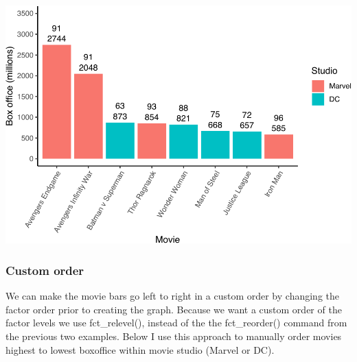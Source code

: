 \documentclass[
]{krantz}
\makeatletter
\newenvironment{Shaded}{\begin{snugshade}}{\end{snugshade}}
\newcommand{\DataTypeTok}[1]{\textcolor[rgb]{0.27,0.27,0.27}{#1}}
\newcommand{\KeywordTok}[1]{\textcolor[rgb]{0.27,0.27,0.27}{\textbf{#1}}}
\newcommand{\NormalTok}[1]{#1}
\newcommand{\OperatorTok}[1]{\textcolor[rgb]{0.43,0.43,0.43}{\textbf{#1}}}
\newcommand{\StringTok}[1]{\textcolor[rgb]{0.5,0.5,0.5}{#1}}
\newenvironment{kframe}{%
\medskip{}
\setlength{\fboxsep}{.8em}
 \def\at@end@of@kframe{}%
 \ifinner\ifhmode%
  \def\at@end@of@kframe{\end{minipage}}%
  \begin{minipage}{\columnwidth}%
 \fi\fi%
 \def\FrameCommand##1{\hskip\@totalleftmargin \hskip-\fboxsep
 \colorbox{shadecolor}{##1}\hskip-\fboxsep
     \hskip-\linewidth \hskip-\@totalleftmargin \hskip\columnwidth}%
 \MakeFramed {\advance\hsize-\width
   \@totalleftmargin\z@ \linewidth\hsize
   \@setminipage}}%
 {\par\unskip\endMakeFramed%
 \at@end@of@kframe}
\renewenvironment{Shaded}{\begin{kframe}}{\end{kframe}}
\makeatother
\begin{document}
\includegraphics[width=0.65\linewidth]{bookdown_files/figure-latex/unnamed-chunk-282-1}

\hypertarget{custom-order}{%
\subsubsection{Custom order}\label{custom-order}}

We can make the movie bars go left to right in a custom order by changing the factor order prior to creating the graph. Because we want a custom order of the factor levels we use fct\_relevel(), instead of the the fct\_reorder() command from the previous two examples. Below I use this approach to manually order movies highest to lowest boxoffice within movie studio (Marvel or DC).

\begin{Shaded}
\end{Shaded}
\end{document}
